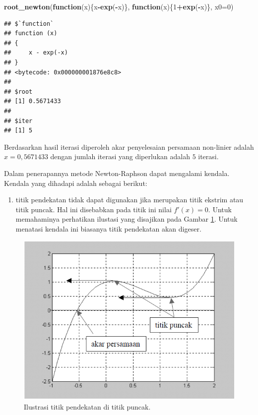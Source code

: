 \documentclass[]{book}
\newenvironment{Shaded}{\begin{snugshade}}{\end{snugshade}}
\newcommand{\ControlFlowTok}[1]{\textcolor[rgb]{0.13,0.29,0.53}{\textbf{#1}}}
\newcommand{\DataTypeTok}[1]{\textcolor[rgb]{0.13,0.29,0.53}{#1}}
\newcommand{\DecValTok}[1]{\textcolor[rgb]{0.00,0.00,0.81}{#1}}
\newcommand{\KeywordTok}[1]{\textcolor[rgb]{0.13,0.29,0.53}{\textbf{#1}}}
\newcommand{\NormalTok}[1]{#1}
\newcommand{\OperatorTok}[1]{\textcolor[rgb]{0.81,0.36,0.00}{\textbf{#1}}}
\providecommand{\tightlist}{%
  \setlength{\itemsep}{0pt}\setlength{\parskip}{0pt}}
\theoremstyle{definition}
\theoremstyle{definition}
\theoremstyle{definition}
\theoremstyle{remark}
\begin{document}
\begin{Shaded}
\begin{Highlighting}[]
\KeywordTok{root_newton}\NormalTok{(}\ControlFlowTok{function}\NormalTok{(x)\{x}\OperatorTok{-}\KeywordTok{exp}\NormalTok{(}\OperatorTok{-}\NormalTok{x)\},}
            \ControlFlowTok{function}\NormalTok{(x)\{}\DecValTok{1}\OperatorTok{+}\KeywordTok{exp}\NormalTok{(}\OperatorTok{-}\NormalTok{x)\},}
              \DataTypeTok{x0=}\DecValTok{0}\NormalTok{)}
\end{Highlighting}
\end{Shaded}

\begin{verbatim}
## $`function`
## function (x) 
## {
##     x - exp(-x)
## }
## <bytecode: 0x000000001876e8c8>
## 
## $root
## [1] 0.5671433
## 
## $iter
## [1] 5
\end{verbatim}

Berdasarkan hasil iterasi diperoleh akar penyelesaian persamaan non-linier adalah \(x=0,5671433\) dengan jumlah iterasi yang diperlukan adalah \(5\) iterasi.

Dalam penerapannya metode Newton-Raphson dapat mengalami kendala. Kendala yang dihadapi adalah sebagai berikut:

\begin{enumerate}
\def\labelenumi{\arabic{enumi}.}
\tightlist
\item
  titik pendekatan tidak dapat digunakan jika merupakan titik ekstrim atau titik puncak. Hal ini disebabkan pada titik ini nilai \(f'\left(x \right)=0\). Untuk memahaminya perhatikan ilustasi yang disajikan pada Gambar \ref{fig:nrviz2}. Untuk menatasi kendala ini biasanya titik pendekatan akan digeser.
\end{enumerate}

\begin{figure}

{\centering \includegraphics[width=0.9\linewidth]{./images/nrviz2} 

}

\caption{Ilustrasi titik pendekatan di titik puncak.}\label{fig:nrviz2}
\end{figure}
\end{document}
